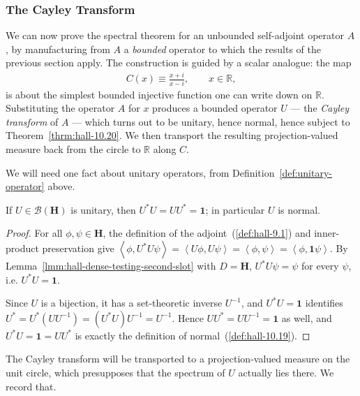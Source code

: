 \subsubsection{The Cayley Transform}
We can now prove the spectral theorem for an unbounded self-adjoint operator $A$, by manufacturing from $A$ a \textit{bounded} operator to which the results of the previous section apply. The construction is guided by a scalar analogue: the map
\begin{align}
    C(x) \equiv \frac{x+i}{x-i}, \qquad x \in \mathbb{R},
\end{align}
is about the simplest bounded injective function one can write down on $\mathbb{R}$. Substituting the operator $A$ for $x$ produces a bounded operator $U$ — the \textit{Cayley transform} of $A$ — which turns out to be unitary, hence normal, hence subject to Theorem~\ref{thrm:hall-10.20}. We then transport the resulting projection-valued measure back from the circle to $\mathbb{R}$ along $C$.

We will need one fact about unitary operators, from Definition~\ref{def:unitary-operator} above.

\begin{lemma}
    \label{lmm:unitary-is-normal}
    \leanok
    If $U \in \mathcal{B}(\mathbf{H})$ is unitary, then $U^*U = UU^* = \mathbf{1}$; in particular $U$ is normal.
\end{lemma}
\begin{proof}
    \leanok
For all $\phi,\psi \in \mathbf{H}$, the definition of the adjoint~(\ref{def:hall-9.1}) and inner-product preservation give $\left< \phi, U^*U\psi \right> = \left< U\phi, U\psi \right> = \left< \phi, \psi \right> = \left< \phi, \mathbf{1}\psi \right>$. By Lemma~\ref{lmm:hall-dense-testing-second-slot} with $D = \mathbf{H}$, $U^*U\psi = \psi$ for every $\psi$, i.e. $U^*U = \mathbf{1}$.

Since $U$ is a bijection, it has a set-theoretic inverse $U^{-1}$, and $U^*U = \mathbf{1}$ identifies $U^* = U^*(UU^{-1}) = (U^*U)U^{-1} = U^{-1}$. Hence $UU^* = UU^{-1} = \mathbf{1}$ as well, and $U^*U = \mathbf{1} = UU^*$ is exactly the definition of normal~(\ref{def:hall-10.19}).
\end{proof}

The Cayley transform will be transported to a projection-valued measure on the unit circle, which presupposes that the spectrum of $U$ actually lies there. We record that.


